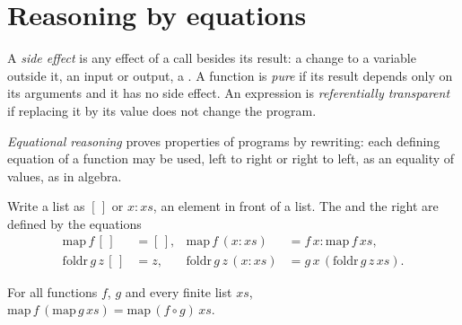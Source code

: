 \label{lst:b2:functional-programming:tail}

\label{out:b2:functional-programming:tail}

\section{Reasoning by equations}\label{sec:b2:functional-programming:equations}

\begin{definition}\label{def:b2:functional-programming:pure}
A \emph{side effect} is any effect of a call besides its result: a change to a variable outside
it, an input or output, a . A function is \emph{pure} if its result depends only on its
arguments and it has no side effect. An expression is \emph{referentially transparent} if replacing it by its value does not change the program.
\end{definition}

\begin{definition}\label{def:b2:functional-programming:equational}
\emph{Equational reasoning} proves properties of  programs by rewriting: each
defining equation of a function may be used, left to right or right to left, as an equality of values, as in
algebra.
\end{definition}

Write a list as $[\,]$ or $x : xs$, an element in front of a list. The  and the right  are defined by
the equations
\begin{align*}
\mathrm{map}\,f\,[\,] &= [\,], & \mathrm{map}\,f\,(x : xs) &= f\,x : \mathrm{map}\,f\,xs,\\
\mathrm{foldr}\,g\,z\,[\,] &= z, & \mathrm{foldr}\,g\,z\,(x : xs) &= g\,x\,(\mathrm{foldr}\,g\,z\,xs).
\end{align*}

\begin{theorem}\label{thm:b2:functional-programming:map-fusion}
For all functions $f$, $g$ and every finite list $xs$, $\mathrm{map}\,f\,(\mathrm{map}\,g\,xs) = \mathrm{map}\,(f
\circ g)\,xs$.
\end{theorem}

